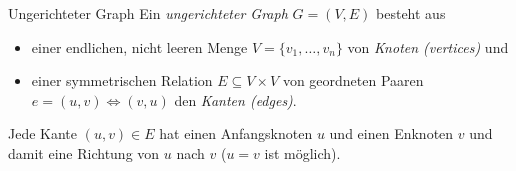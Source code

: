 \documentclass[german]{../spicker}
\begin{document}
\begin{defi}{Ungerichteter Graph}
    Ein \emph{ungerichteter Graph} $G = (V, E)$ besteht aus
    \begin{itemize}
        \item einer endlichen, nicht leeren Menge $V = \{v_1, \ldots, v_n\}$ von \emph{Knoten (vertices)} und
        \item einer symmetrischen Relation $E \subseteq V \times V$ von geordneten Paaren $e = (u, v) \iff (v, u)$ den \emph{Kanten (edges)}.
    \end{itemize}

    Jede Kante $(u,v) \in E$ hat einen Anfangsknoten $u$ und einen Enknoten $v$ und damit eine Richtung von $u$ nach $v$ ($u=v$ ist möglich).

    \vspace{1em}
    \begin{center}
    \end{center}
\end{defi}
\end{document}
